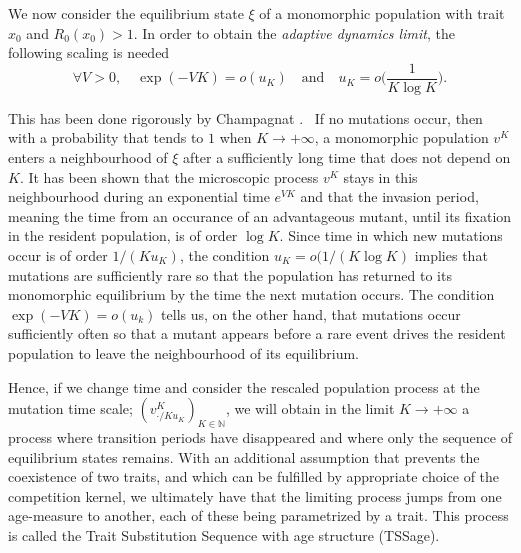 \documentclass[11pt, a4paper]{article}
\theoremstyle{definition}
\begin{document}
    We now consider the equilibrium state $\xi$ of a monomorphic population with trait $x_0$ and $R_0(x_0)>1$.
    In order to obtain the \emph{adaptive dynamics limit}, the following scaling is needed
    \begin{equation}
        \forall V>0,\quad \exp(-VK) = o(u_K)\quad \text{and}\quad u_K = o\Big( \frac{1}{K\log K} \Big).
    \end{equation}

    This has been done rigorously by Champagnat \autocite{champagnat2006tss}.
    ~If no mutations occur, then with a probability that tends to $1$ when $K\rightarrow +\infty$, a monomorphic population $v^K$ enters a neighbourhood of $\xi$ after a sufficiently long time that does not depend on $K$. It has been shown that the microscopic process $v^K$ stays in this neighbourhood during an exponential time $e^{VK}$ and that the invasion period, meaning the time from an occurance of an advantageous mutant, until its fixation in the resident population, is of order $\log K$. Since time in
    which new mutations occur is of order $1/(Ku_K)$, the condition $u_K = o(1/(K\log K)$ implies that mutations are sufficiently rare so that the population has returned to its monomorphic equilibrium by the time the next mutation occurs. The condition $\exp(-VK) = o(u_k)$ tells us, on the other hand, that mutations occur sufficiently often so that a mutant appears before a rare event drives the resident population to leave the neighbourhood  of its equilibrium.

    Hence, if we change time and consider the rescaled population process at the mutation time scale; $(v^K_{\cdot/Ku_K})_{K\in \mathbb{N}}$, we will obtain in the limit $K\rightarrow +\infty$ a process where transition periods have disappeared and where only the sequence of equilibrium states remains.
    With an additional assumption that prevents the coexistence of two traits, and which can be fulfilled by appropriate choice of the competition kernel, we ultimately have that the limiting process jumps from one age-measure to another, each of these being parametrized by a trait. This process is called the Trait Substitution Sequence with age structure (TSSage).
    
\end{document}
